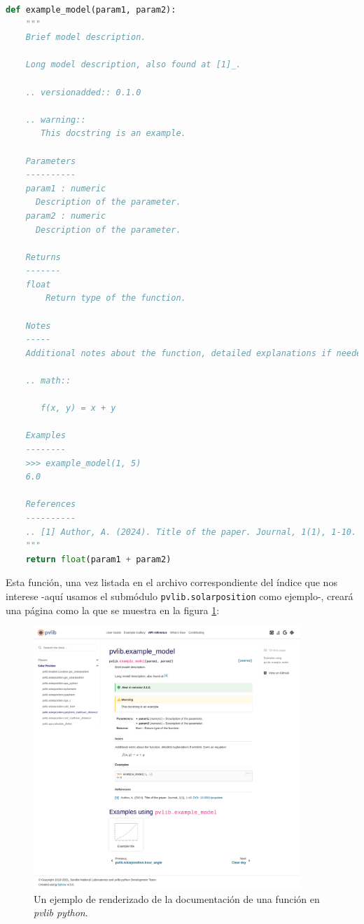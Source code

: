 \begin{lstlisting}[language=Python]
def example_model(param1, param2):
    """
    Brief model description.

    Long model description, also found at [1]_.

    .. versionadded:: 0.1.0

    .. warning::
       This docstring is an example.

    Parameters
    ----------
    param1 : numeric
      Description of the parameter.
    param2 : numeric
      Description of the parameter.

    Returns
    -------
    float
        Return type of the function.

    Notes
    -----
    Additional notes about the function, detailed explanations if needed. Even an equation:

    .. math::

       f(x, y) = x + y

    Examples
    --------
    >>> example_model(1, 5)
    6.0

    References
    ----------
    .. [1] Author, A. (2024). Title of the paper. Journal, 1(1), 1-10. :doi:`10.0001/populate`
    """
    return float(param1 + param2)
\end{lstlisting}

Esta función, una vez listada en el archivo correspondiente del índice que nos interese -aquí usamos el submódulo \lstinline{pvlib.solarposition} como ejemplo-, creará una página como la que se muestra en la figura \ref{fig:doc_function_example}:

\begin{figure}[H]
    \centering
    \includegraphics[width=0.9\textwidth]{./images/doc_example/function_stretch.png}
    \caption{Un ejemplo de renderizado de la documentación de una función en \textit{pvlib python}.}
    \label{fig:doc_function_example}
\end{figure}

